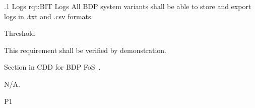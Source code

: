\ONERQMTVKSA
{\RqtNumberBase.1}
{\BIT Logs}
{rqt:BIT Logs}
{All BDP system variants shall be able to store and export \BIT logs in .txt and .csv formats.}%
{
	\item [Phase 1] Threshold
}
{This requirement shall be verified by demonstration.}
{
\item [5.5.15.2] Section in CDD for BDP FoS~\cite{ref__BDP_FOS_CDD}.
}
{
  \item N/A.
}
{P1}
